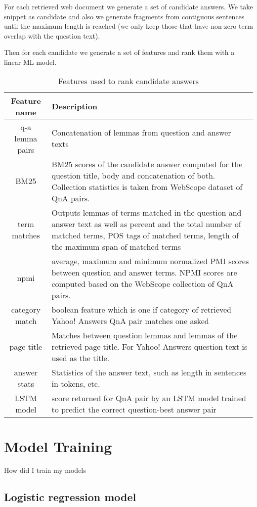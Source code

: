 \documentclass[]{article}
\begin{document}
For each retrieved web document we generate a set of candidate answers. We take snippet as candidate and also we generate fragments from contiguous sentences until the maximum length is reached (we only keep those that have non-zero term overlap with the question text).

Then for each candidate we generate a set of features and rank them with a linear ML model.

\begin{table}[t]
\label{table:features}
\caption{Features used to rank candidate answers}
\begin{tabular}{|c|p{10cm}|}
\hline
Feature name & Description \\
\hline
\hline
q-a lemma pairs & Concatenation of lemmas from question and answer texts\\
BM25 & BM25 scores of the candidate answer computed for the question title, body and concatenation of both. Collection statistics is taken from WebScope dataset of QnA pairs. \\
term matches & Outputs lemmas of terms matched in the question and answer text as well as percent and the total number of matched terms, POS tags of matched terms, length of the maximum span of matched terms\\
npmi & average, maximum and minimum normalized PMI scores between question and answer terms. NPMI scores are computed based on the WebScope collection of QnA pairs.\\
category match & boolean feature which is one if category of retrieved Yahoo! Answers QnA pair matches one asked\\
page title & Matches between question lemmas and lemmas of the retrieved page title. For Yahoo! Answers question text is used as the title.\\
answer stats & Statistics of the answer text, such as length in sentences in tokens, etc.\\
LSTM model & score returned for QnA pair by an LSTM model trained to predict the correct question-best answer pair\\
\hline
\end{tabular}
\end{table}

\section{Model Training}
How did I train my models

\subsection{Logistic regression model}
\end{document}

